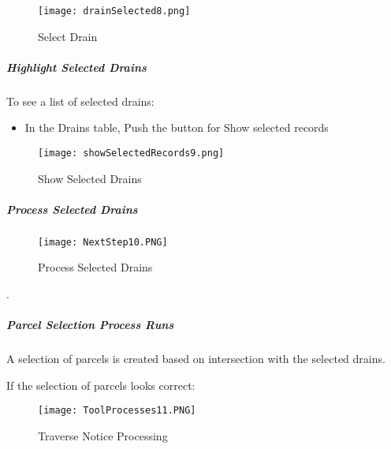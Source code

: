 \begin{figure}[h!]
 \centering
     \texttt{[image: drainSelected8.png]}
 \caption{Select Drain}


 \end{figure}

\clearpage
     
  
\subparagraph{Highlight Selected Drains}

\noindent To see a list of selected drains:

\begin{itemize}

\item In the Drains table, Push the button for Show selected records

\end{itemize}

\begin{figure}[h!]
 \centering
     \texttt{[image: showSelectedRecords9.png]}
 \caption{Show Selected Drains}


 \end{figure}

\clearpage

\subparagraph{Process Selected Drains}

  \begin{wrapfigure}{r}{0.6\textwidth}
  \centering
      \texttt{[image: NextStep10.PNG]}
  \caption{Process Selected Drains}
  \end{wrapfigure}
.

  \vspace{1.75in}



\clearpage

\subparagraph{Parcel Selection Process Runs}
\vspace{.5in}

\noindent A selection of parcels is created based on intersection with the selected drains.

\vspace{.5in}

\noindent If the selection of parcels looks correct:


\begin{figure}[h!]
 \centering
     \texttt{[image: ToolProcesses11.PNG]}
 \caption{Traverse Notice Processing}


 \end{figure}
 
